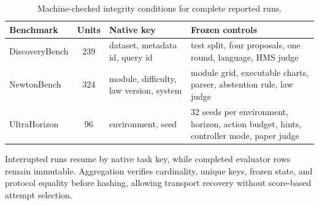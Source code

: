 \documentclass[letterpaper]{article}
\newcommand{\tblhdr}{\rowcolor{headerrow}}
\begin{document}
\begin{table}[htbp]
\centering
\small
\begin{tabularx}{0.96\textwidth}{|l|c|Y|Y|}
\hline
\tblhdr
Benchmark & Units & Native key & Frozen controls \\
\hline
DiscoveryBench & 239 & dataset, metadata id, query id &
test split, four proposals, one round, language, HMS judge \\
\hline
NewtonBench & 324 & module, difficulty, law version, system &
module grid, executable charts, parser, abstention rule, law judge \\
\hline
UltraHorizon & 96 & environment, seed &
32 seeds per environment, horizon, action budget, hints, controller mode,
paper judge \\
\hline
\end{tabularx}
\caption{Machine-checked integrity conditions for complete reported runs.}
\label{tab:run_integrity}
\end{table}

Interrupted runs resume by native task key, while completed evaluator rows
remain immutable. Aggregation verifies cardinality, unique keys, frozen state,
and protocol equality before hashing, allowing transport recovery without
score-based attempt selection.
\end{document}

